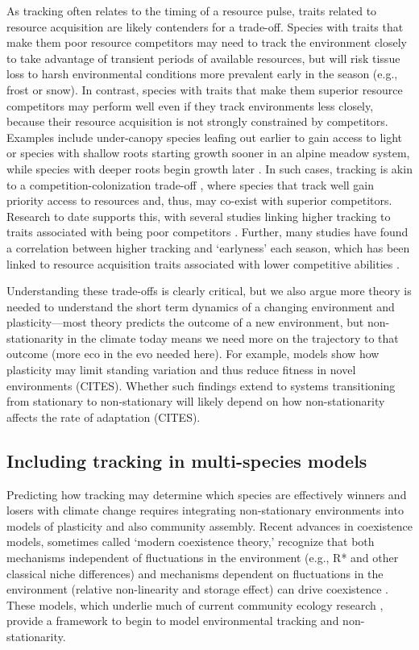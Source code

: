 \documentclass[11pt,letterpaper]{article}
\begin{document}
As tracking often relates to the timing of a resource pulse, traits related to resource acquisition are likely contenders for a trade-off. Species with traits that make them poor resource competitors may need to track the environment closely to take advantage of transient periods of available resources, but will risk tissue loss to harsh environmental conditions more prevalent early in the season (e.g., frost or snow). In contrast, species with traits that make them superior resource competitors may perform well even if they track environments less closely, because their resource acquisition is not strongly constrained by competitors. Examples include under-canopy species leafing out earlier to gain access to light \citep{heberling2019} or species with shallow roots starting growth sooner in an alpine meadow system, while species with deeper roots begin growth later \citep{Zhu2016BioLetters}. In such cases, tracking is akin to a competition-colonization trade-off \citep{Amarasekare:2003tq}, where species that track well gain priority access to resources and, thus, may co-exist with superior competitors. Research to date supports this, with several studies linking higher tracking to traits associated with being poor competitors \citep{Dorji2013,lasky2016,Zhu2016BioLetters}. Further, many studies have found a correlation between higher tracking and `earlyness' each season, which has been linked to resource acquisition traits associated with lower competitive abilities \citep[][see Box `Trait trade-offs with tracking']{wolkovich2014aob}. 

Understanding these trade-offs is clearly critical, but we also argue more theory is needed to understand the short term dynamics of a changing environment and plasticity---most theory predicts the outcome of a new environment, but non-stationarity in the climate today means we need more on the trajectory to that outcome (more eco in the evo needed here). For example, models show how plasticity may limit standing variation and thus reduce fitness in novel environments (CITES). Whether such findings extend to systems transitioning from stationary to non-stationary will likely depend on how non-stationarity affects the rate of adaptation (CITES). 

\subsection{Including tracking in multi-species models}
Predicting how tracking may determine which species are effectively winners and losers with climate change requires integrating non-stationary environments into models of plasticity and also community assembly. Recent advances in coexistence models, sometimes called `modern coexistence theory,' recognize that both mechanisms independent of fluctuations in the environment (e.g., R* and other classical niche differences) and mechanisms dependent on fluctuations in the environment (relative non-linearity and storage effect) can drive coexistence \citep{Chesson:1997dz,Chesson:2000vd}. These models, which underlie much of current community ecology research \citep{Mayfield:2010fe,barabas2018,ellner2019}, provide a framework to begin to model environmental tracking and non-stationarity. 
\end{document}
